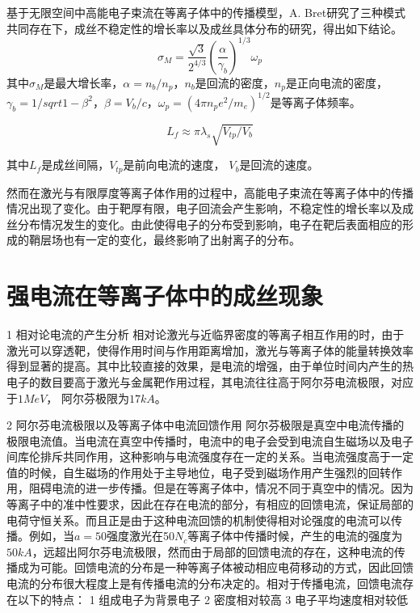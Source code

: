 基于无限空间中高能电子束流在等离子体中的传播模型，A. Bret\cite{bret2005characterization,bret2004collective}研究了三种模式共同存在下，成丝不稳定性的增长率以及成丝具体分布的研究，得出如下结论。
\begin{equation}
\label{eqn:maxGrowth}
{\sigma}_M= \frac{\sqrt{3}}{2^{4/3}}(\frac{\alpha}{{\gamma}_b})^{1/3} {\omega}_p
\end{equation} 
其中${\sigma}_M$是最大增长率，$\alpha=n_b/n_p$，$n_b$是回流的密度，$n_p$是正向电流的密度，${\gamma}_b=1/sqrt{1-{\beta}^2}$，$\beta=V_b/c$，${\omega}_p=(4 \pi n_p e^2/m_e)^{1/2} $是等离子体频率。

\begin{equation}
\label{eqn:filamentSpace}
L_f \approx \pi {\lambda}_s \sqrt{V_{tp}/V_b}
\end{equation} 

其中$L_f$是成丝间隔，$V_{tp}$是前向电流的速度， $V_b$是回流的速度。


然而在激光与有限厚度等离子体作用的过程中，高能电子束流在等离子体中的传播情况出现了变化。由于靶厚有限，电子回流会产生影响，不稳定性的增长率以及成丝分布情况发生的变化。由此使得电子的分布受到影响，电子在靶后表面相应的形成的鞘层场也有一定的变化，最终影响了出射离子的分布。




\section{强电流在等离子体中的成丝现象}

1 相对论电流的产生分析
相对论激光与近临界密度的等离子相互作用的时，由于激光可以穿透靶，使得作用时间与作用距离增加，激光与等离子体的能量转换效率得到显著的提高。其中比较直接的效果，是电流的增强，由于单位时间内产生的热电子的数目要高于激光与金属靶作用过程，其电流往往高于阿尔芬电流极限，对应于$1MeV$， 阿尔芬极限为$17kA$。


2 阿尔芬电流极限以及等离子体中电流回馈作用
阿尔芬极限是真空中电流传播的极限电流值。当电流在真空中传播时，电流中的电子会受到电流自生磁场以及电子间库伦排斥共同作用，这种影响与电流强度存在一定的关系。当电流强度高于一定值的时候，自生磁场的作用处于主导地位，电子受到磁场作用产生强烈的回转作用，阻碍电流的进一步传播。但是在等离子体中，情况不同于真空中的情况。因为等离子中的准中性要求，因此在存在电流的部分，有相应的回馈电流，保证局部的电荷守恒关系。而且正是由于这种电流回馈的机制使得相对论强度的电流可以传播。例如，当$a=50$强度激光在50$N_c$等离子体中传播时候，产生的电流的强度为$50kA$，远超出阿尔芬电流极限，然而由于局部的回馈电流的存在，这种电流的传播成为可能。回馈电流的分布是一种等离子体被动相应电荷移动的方式，因此回馈电流的分布很大程度上是有传播电流的分布决定的。相对于传播电流，回馈电流存在以下的特点：
1 组成电子为背景电子
2 密度相对较高
3 电子平均速度相对较低



